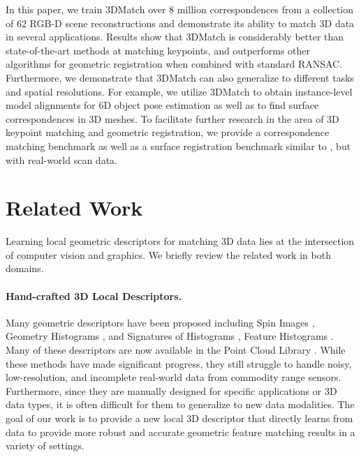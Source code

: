 \documentclass[10pt,twocolumn,letterpaper]{article}
\newcommand{\mypara}{\vspace*{-3mm}\paragraph}
\begin{document}
In this paper, we train 3DMatch over 8 million correspondences from a collection of 62 RGB-D scene reconstructions \cite{valentin2016learning,shotton2013scene,SUN3D,lai2014unsupervised,halber2016structured} and demonstrate its ability to match 3D data in several applications. Results show that 3DMatch is considerably better than state-of-the-art methods at matching keypoints, and outperforms other algorithms for geometric registration when combined with standard RANSAC. Furthermore, we demonstrate that 3DMatch can also generalize to different tasks and spatial resolutions.
For example, we utilize 3DMatch to obtain instance-level model alignments for 6D object pose estimation as well as to find surface correspondences in 3D meshes. 
To facilitate further research in the area of 3D keypoint matching and geometric registration, we provide a correspondence matching benchmark as well as a surface registration benchmark similar to \cite{choi2015robust}, but with real-world scan data.




\section{Related Work}

Learning local geometric descriptors for matching 3D data lies at the intersection of computer vision and graphics. We briefly review the related work in both domains.

\mypara{Hand-crafted 3D Local Descriptors.}
Many geometric descriptors have been proposed including Spin Images \cite{johnson1999using}, Geometry Histograms \cite{frome2004recognizing}, and Signatures of Histograms \cite{tombari2010unique}, Feature Histograms \cite{rusu2008aligning}. 
Many of these descriptors are now available in the Point Cloud Library \cite{aldoma2012point}.
While these methods have made significant progress, they still struggle to handle noisy, low-resolution, and incomplete real-world data from commodity range sensors.
Furthermore, since they are manually designed for specific applications or 3D data types, it is often difficult for them to generalize to new data modalities. %
The goal of our work is to provide a new local 3D descriptor that directly learns from data to provide more robust and accurate geometric feature matching results in a variety of settings.
\end{document}
